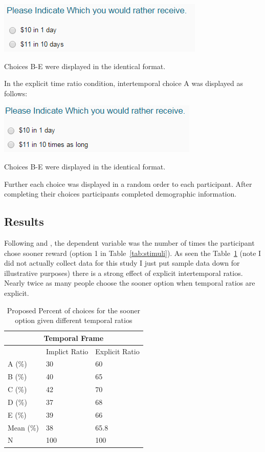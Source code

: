 \documentclass[]{article}
\begin{document}
\includegraphics[]{study1_implicit}

Choices B-E were displayed in the identical format. 

In the explicit time ratio condition, intertemporal choice A was displayed as follows:

\includegraphics[]{study1_explicit}

Choices B-E were displayed in the identical format. 

Further each choice was displayed in a random order to each participant. 
After completing their choices participants completed demographic information.

\subsection{Results}

Following  and , the dependent variable was the number of times the participant chose sooner reward (option 1 in Table~\ref{tab:stimuli}). 
As seen the Table~\ref{tab:study1results} (note I did not actually collect data for this study I just put sample data down for illustrative purposes) there is a strong effect of explicit intertemporal ratios. 
Nearly twice as many people choose the sooner option when temporal ratios are explicit.




\begin{table}[!ht]
	\caption{Proposed Percent of choices for the sooner option given different temporal ratios} 
	\label{tab:study1results}
\begin{tabular}{ p{3cm}||p{3cm}|p{3cm}  }
	\multicolumn{3}{|c|}{Temporal Frame} \\
	\hline
	 & Implict Ratio & Explicit Ratio\\
	\hline
	A (\%)	 & 30  & 60\\
	B (\%) 	 & 40  & 65   \\
	C (\%) 	 & 42  & 70\\
	D (\%)   & 37  & 68\\
	E (\%)   & 39  & 66\\
	Mean (\%) & 38  & 65.8 \\
	N  	 & 100  & 100\\
	\hline
	
\end{tabular}
\end{table}
\end{document}
